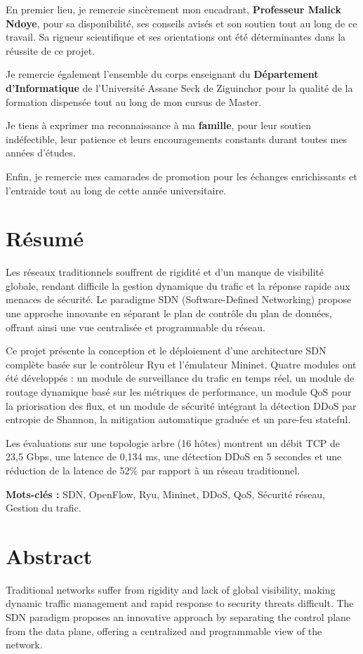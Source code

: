 \documentclass[12pt,a4paper]{report}
\begin{document}
En premier lieu, je remercie sincèrement mon encadrant,
\textbf{Professeur Malick Ndoye}, pour sa disponibilité,
ses conseils avisés et son soutien tout au long de ce
travail. Sa rigueur scientifique et ses orientations ont
été déterminantes dans la réussite de ce projet.

Je remercie également l'ensemble du corps enseignant du
\textbf{Département d'Informatique} de l'Université Assane
Seck de Ziguinchor pour la qualité de la formation dispensée
tout au long de mon cursus de Master.

Je tiens à exprimer ma reconnaissance à ma \textbf{famille},
pour leur soutien indéfectible, leur patience et leurs
encouragements constants durant toutes mes années d'études.

Enfin, je remercie mes camarades de promotion pour les
échanges enrichissants et l'entraide tout au long de
cette année universitaire.
\newpage

\chapter*{Résumé}
Les réseaux traditionnels souffrent de rigidité et d'un
manque de visibilité globale, rendant difficile la gestion
dynamique du trafic et la réponse rapide aux menaces de
sécurité. Le paradigme SDN (Software-Defined Networking)
propose une approche innovante en séparant le plan de
contrôle du plan de données, offrant ainsi une vue
centralisée et programmable du réseau.

Ce projet présente la conception et le déploiement d'une
architecture SDN complète basée sur le contrôleur Ryu et
l'émulateur Mininet. Quatre modules ont été développés :
un module de surveillance du trafic en temps réel, un module
de routage dynamique basé sur les métriques de performance,
un module QoS pour la priorisation des flux, et un module
de sécurité intégrant la détection DDoS par entropie de
Shannon, la mitigation automatique graduée et un pare-feu
stateful.

Les évaluations sur une topologie arbre (16 hôtes) montrent
un débit TCP de 23,5 Gbps, une latence de 0,134 ms, une
détection DDoS en 5 secondes et une réduction de la latence
de 52\% par rapport à un réseau traditionnel.

\textbf{Mots-clés :} SDN, OpenFlow, Ryu, Mininet, DDoS,
QoS, Sécurité réseau, Gestion du trafic.
\newpage

\chapter*{Abstract}
Traditional networks suffer from rigidity and lack of global
visibility, making dynamic traffic management and rapid
response to security threats difficult. The SDN paradigm
proposes an innovative approach by separating the control
plane from the data plane, offering a centralized and
programmable view of the network.
\end{document}
